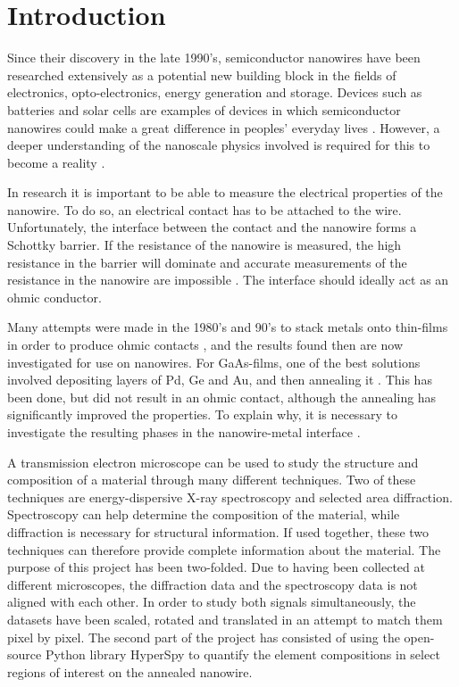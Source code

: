 \chapter{Introduction}

Since their discovery in the late 1990's, semiconductor nanowires have been researched extensively as a potential new building block in the fields of electronics, opto-electronics, energy generation and storage. Devices such as batteries and solar cells are examples of devices in which semiconductor nanowires could make a great difference in peoples' everyday lives \cite{WeiLu}. However, a deeper understanding of the nanoscale physics involved is required for this to become a reality \cite{nanowire-paper}. 

In research it is important to be able to measure the electrical properties of the nanowire. To do so, an electrical contact has to be attached to the wire. Unfortunately, the interface between the contact and the nanowire forms a Schottky barrier. If the resistance of the nanowire is measured, the high resistance in the barrier will dominate and accurate measurements of the resistance in the nanowire are impossible \cite{Julie-pres}. The interface should ideally act as an ohmic conductor.

Many attempts were made in the 1980's and 90's to stack metals onto thin-films in order to produce ohmic contacts \cite{Baca}, and the results found then are now investigated for use on nanowires. For GaAs-films, one of the best solutions involved depositing layers of Pd, Ge and Au, and then annealing it \cite{nanowire-paper}. This has been done, but did not result in an ohmic contact, although the annealing has significantly improved the properties. To explain why, it is necessary to investigate the resulting phases in the nanowire-metal interface \cite{Julie-pres}.

A transmission electron microscope can be used to study the structure and composition of a material through many different techniques. Two of these techniques are energy-dispersive X-ray spectroscopy and selected area diffraction. Spectroscopy can help determine the composition of the material, while diffraction is necessary for structural information. If used together, these two techniques can therefore provide complete information about the material. The purpose of this project has been two-folded. Due to having been collected at different microscopes, the diffraction data and the spectroscopy data is not aligned with each other. In order to study both signals simultaneously, the datasets have been scaled, rotated and translated in an attempt to match them pixel by pixel. The second part of the project has consisted of using the open-source Python library HyperSpy \cite{hyperspy} to quantify the element compositions in select regions of interest on the annealed nanowire.

